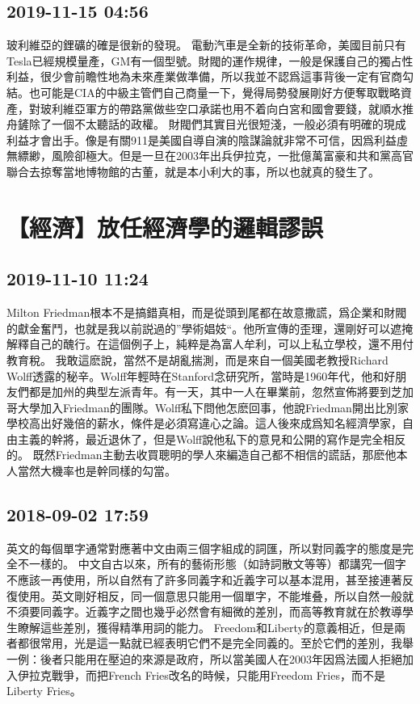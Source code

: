 \documentclass[twocolumn]{ctexart}
\begin{document}
\subsection*{2019-11-15 04:56}

玻利維亞的鋰礦的確是很新的發現。
電動汽車是全新的技術革命，美國目前只有Tesla已經規模量產，GM有一個型號。財閥的運作規律，一般是保護自己的獨占性利益，很少會前瞻性地為未來產業做準備，所以我並不認爲這事背後一定有官商勾結。也可能是CIA的中級主管們自己商量一下，覺得局勢發展剛好方便奪取戰略資產，對玻利維亞軍方的帶路黨做些空口承諾也用不着向白宮和國會要錢，就順水推舟鏟除了一個不太聽話的政權。
財閥們其實目光很短淺，一般必須有明確的現成利益才會出手。像是有關911是美國自導自演的陰謀論就非常不可信，因爲利益虛無縹緲，風險卻極大。但是一旦在2003年出兵伊拉克，一批億萬富豪和共和黨高官聯合去掠奪當地博物館的古董，就是本小利大的事，所以也就真的發生了。
\section*{【經濟】放任經濟學的邏輯謬誤}
\subsection*{2019-11-10 11:24}

Milton Friedman根本不是搞錯真相，而是從頭到尾都在故意撒謊，爲企業和財閥的獻金奮鬥，也就是我以前説過的”學術娼妓“。他所宣傳的歪理，還剛好可以遮掩解釋自己的醜行。在這個例子上，純粹是為富人牟利，可以上私立學校，還不用付教育稅。 
我敢這麽說，當然不是胡亂揣測，而是來自一個美國老教授Richard Wolff透露的秘辛。Wolff年輕時在Stanford念研究所，當時是1960年代，他和好朋友們都是加州的典型左派青年。有一天，其中一人在畢業前，忽然宣佈將要到芝加哥大學加入Friedman的團隊。Wolff私下問他怎麽回事，他說Friedman開出比別家學校高出好幾倍的薪水，條件是必須寫違心之論。這人後來成爲知名經濟學家，自由主義的幹將，最近退休了，但是Wolff說他私下的意見和公開的寫作是完全相反的。 
既然Friedman主動去收買聰明的學人來編造自己都不相信的謊話，那麽他本人當然大機率也是幹同樣的勾當。
\subsection*{2018-09-02 17:59}

英文的每個單字通常對應著中文由兩三個字組成的詞匯，所以對同義字的態度是完全不一樣的。
中文自古以來，所有的藝術形態（如詩詞散文等等）都講究一個字不應該一再使用，所以自然有了許多同義字和近義字可以基本混用，甚至接連著反復使用。英文剛好相反，同一個意思只能用一個單字，不能堆叠，所以自然一般就不須要同義字。近義字之間也幾乎必然會有細微的差別，而高等教育就在於教導學生瞭解這些差別，獲得精準用詞的能力。
Freedom和Liberty的意義相近，但是兩者都很常用，光是這一點就已經表明它們不是完全同義的。至於它們的差別，我舉一例：後者只能用在壓迫的來源是政府，所以當美國人在2003年因爲法國人拒絕加入伊拉克戰爭，而把French Fries改名的時候，只能用Freedom Fries，而不是Liberty Fries。
\end{document}
